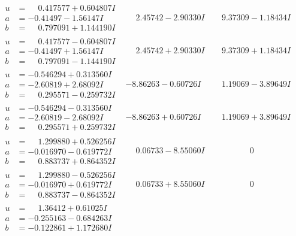 \documentclass[1p]{elsarticle_modified}
\theoremstyle{definition}
\begin{document}
$$\begin{array}{c|c|c}
\begin{aligned}
u &= \phantom{-}0.417577 + 0.604807 I \\
a &= -0.41497 - 1.56147 I \\
b &= \phantom{-}0.797091 + 1.144190 I\end{aligned}
 & \phantom{-}2.45742 - 2.90330 I & \phantom{-}9.37309 - 1.18434 I \\ \hline\begin{aligned}
u &= \phantom{-}0.417577 - 0.604807 I \\
a &= -0.41497 + 1.56147 I \\
b &= \phantom{-}0.797091 - 1.144190 I\end{aligned}
 & \phantom{-}2.45742 + 2.90330 I & \phantom{-}9.37309 + 1.18434 I \\ \hline\begin{aligned}
u &= -0.546294 + 0.313560 I \\
a &= -2.60819 + 2.68092 I \\
b &= \phantom{-}0.295571 - 0.259732 I\end{aligned}
 & -8.86263 - 0.60726 I & \phantom{-}1.19069 - 3.89649 I \\ \hline\begin{aligned}
u &= -0.546294 - 0.313560 I \\
a &= -2.60819 - 2.68092 I \\
b &= \phantom{-}0.295571 + 0.259732 I\end{aligned}
 & -8.86263 + 0.60726 I & \phantom{-}1.19069 + 3.89649 I \\ \hline\begin{aligned}
u &= \phantom{-}1.299880 + 0.526256 I \\
a &= -0.016970 - 0.619772 I \\
b &= \phantom{-}0.883737 + 0.864352 I\end{aligned}
 & \phantom{-}0.06733 - 8.55060 I & \phantom{-0.000000 } 0 \\ \hline\begin{aligned}
u &= \phantom{-}1.299880 - 0.526256 I \\
a &= -0.016970 + 0.619772 I \\
b &= \phantom{-}0.883737 - 0.864352 I\end{aligned}
 & \phantom{-}0.06733 + 8.55060 I & \phantom{-0.000000 } 0 \\ \hline\begin{aligned}
u &= \phantom{-}1.36412 + 0.61025 I \\
a &= -0.255163 - 0.684263 I \\
b &= -0.122861 + 1.172680 I\end{aligned}

\end{array}$$
\end{document}
